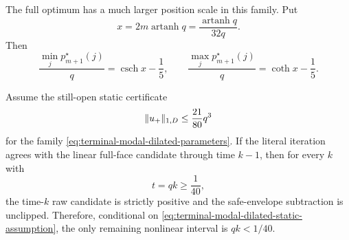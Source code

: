 The full optimum has a much larger position scale in this family.  Put
\begin{equation}
 x=2m\operatorname{artanh}q
   =\frac{\operatorname{artanh}q}{32q}.
 \label{eq:terminal-modal-dilated-x}
\end{equation}
Then
\begin{equation}
 \frac{\min_jp_{m+1}^\star(j)}q=\operatorname{csch}x-\frac15,
 \qquad
 \frac{\max_jp_{m+1}^\star(j)}q=\operatorname{coth}x-\frac15.
 \label{eq:terminal-modal-dilated-optimum-extrema}
\end{equation}

\begin{lemma}
\label{lem:terminal-modal-dilated-late-bridge}
Assume the still-open static certificate
\begin{equation}
 \lVert u_+\rVert_{1,D}\le\frac{21}{80}q^3
 \label{eq:terminal-modal-dilated-static-assumption}
\end{equation}
for the family \eqref{eq:terminal-modal-dilated-parameters}.  If the literal
iteration agrees with the linear full-face candidate through time $k-1$, then
for every $k$ with
\begin{equation}
 t=qk\ge\frac1{40},
\end{equation}
the time-$k$ raw candidate is strictly positive and the safe-envelope
subtraction is unclipped.  Therefore, conditional on
\eqref{eq:terminal-modal-dilated-static-assumption}, the only remaining
nonlinear interval is $qk<1/40$.
\end{lemma}

